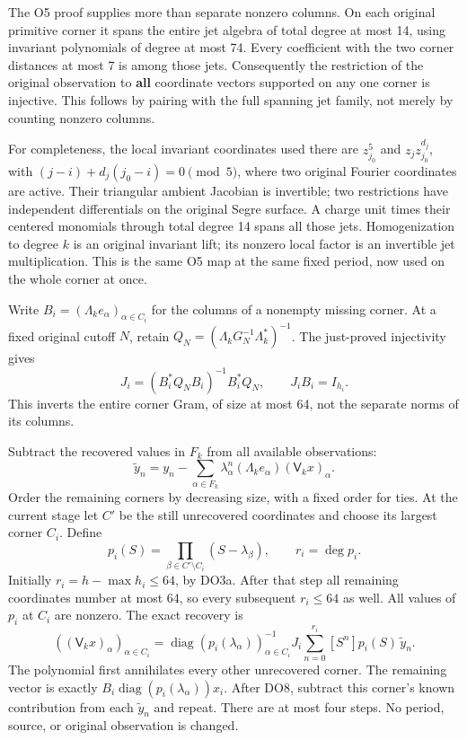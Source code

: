 The O5 proof supplies more than separate nonzero columns. On each original primitive corner it spans the entire jet algebra of total degree at most 14, using invariant polynomials of degree at most 74. Every coefficient with the two corner distances at most 7 is among those jets. Consequently the restriction of the original observation to \textbf{all} coordinate vectors supported on any one corner is injective. This follows by pairing with the full spanning jet family, not merely by counting nonzero columns.

For completeness, the local invariant coordinates used there are \(z_{j_0}^5\) and \(z_jz_{j_0}^{d_j}\), with \((j-i)+d_j(j_0-i)=0\pmod5\), where two original Fourier coordinates are active. Their triangular ambient Jacobian is invertible; two restrictions have independent differentials on the original Segre surface. A charge unit times their centered monomials through total degree 14 spans all those jets. Homogenization to degree \(k\) is an original invariant lift; its nonzero local factor is an invertible jet multiplication. This is the same O5 map at the same fixed period, now used on the whole corner at once.

Write \(B_i=(\Lambda_k e_\alpha)_{\alpha\in C_i}\) for the columns of a nonempty missing corner. At a fixed original cutoff \(N\), retain \(Q_N=(\Lambda_kG_N^{-1}\Lambda_k^*)^{-1}\). The just-proved injectivity gives \[
J_i=(B_i^*Q_NB_i)^{-1}B_i^*Q_N,\qquad J_iB_i=I_{h_i}.
\tag{DO7}
\] This inverts the entire corner Gram, of size at most 64, not the separate norms of its columns.

Subtract the recovered values in \(F_k\) from all available observations: \[
\widetilde y_n=y_n-\sum_{\alpha\in F_k}
\lambda_\alpha^n(\Lambda_k e_\alpha)(\mathsf V_kx)_\alpha.
\] Order the remaining corners by decreasing size, with a fixed order for ties. At the current stage let \(C'\) be the still unrecovered coordinates and choose its largest corner \(C_i\). Define \[
p_i(S)=\prod_{\beta\in C'\setminus C_i}(S-\lambda_\beta),\qquad
r_i=\deg p_i.
\] Initially \(r_i=h-\max h_i\le64\), by DO3a. After that step all remaining coordinates number at most 64, so every subsequent \(r_i\le64\) as well. All values of \(p_i\) at \(C_i\) are nonzero. The exact recovery is \[
\boxed{\displaystyle
((\mathsf V_kx)_\alpha)_{\alpha\in C_i}
=\operatorname{diag}(p_i(\lambda_\alpha))_{\alpha\in C_i}^{-1}
J_i\sum_{n=0}^{r_i}[S^n]p_i(S)\,\widetilde y_n.}
\tag{DO8}
\] The polynomial first annihilates every other unrecovered corner. The remaining vector is exactly \(B_i\operatorname{diag}(p_i(\lambda_\alpha))x_i\). After DO8, subtract this corner's known contribution from each \(\widetilde y_n\) and repeat. There are at most four steps. No period, source, or original observation is changed.

